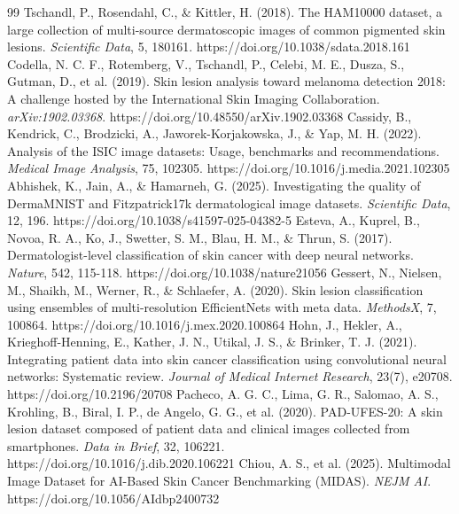 \documentclass[11pt,a4paper]{article}
\begin{document}
\begin{thebibliography}{99}
 Tschandl, P., Rosendahl, C., \& Kittler, H. (2018). The HAM10000 dataset, a large collection of multi-source dermatoscopic images of common pigmented skin lesions. \textit{Scientific Data}, 5, 180161. https://doi.org/10.1038/sdata.2018.161
 Codella, N. C. F., Rotemberg, V., Tschandl, P., Celebi, M. E., Dusza, S., Gutman, D., et al. (2019). Skin lesion analysis toward melanoma detection 2018: A challenge hosted by the International Skin Imaging Collaboration. \textit{arXiv:1902.03368}. https://doi.org/10.48550/arXiv.1902.03368
 Cassidy, B., Kendrick, C., Brodzicki, A., Jaworek-Korjakowska, J., \& Yap, M. H. (2022). Analysis of the ISIC image datasets: Usage, benchmarks and recommendations. \textit{Medical Image Analysis}, 75, 102305. https://doi.org/10.1016/j.media.2021.102305
 Abhishek, K., Jain, A., \& Hamarneh, G. (2025). Investigating the quality of DermaMNIST and Fitzpatrick17k dermatological image datasets. \textit{Scientific Data}, 12, 196. https://doi.org/10.1038/s41597-025-04382-5
 Esteva, A., Kuprel, B., Novoa, R. A., Ko, J., Swetter, S. M., Blau, H. M., \& Thrun, S. (2017). Dermatologist-level classification of skin cancer with deep neural networks. \textit{Nature}, 542, 115-118. https://doi.org/10.1038/nature21056
 Gessert, N., Nielsen, M., Shaikh, M., Werner, R., \& Schlaefer, A. (2020). Skin lesion classification using ensembles of multi-resolution EfficientNets with meta data. \textit{MethodsX}, 7, 100864. https://doi.org/10.1016/j.mex.2020.100864
 Hohn, J., Hekler, A., Krieghoff-Henning, E., Kather, J. N., Utikal, J. S., \& Brinker, T. J. (2021). Integrating patient data into skin cancer classification using convolutional neural networks: Systematic review. \textit{Journal of Medical Internet Research}, 23(7), e20708. https://doi.org/10.2196/20708
 Pacheco, A. G. C., Lima, G. R., Salomao, A. S., Krohling, B., Biral, I. P., de Angelo, G. G., et al. (2020). PAD-UFES-20: A skin lesion dataset composed of patient data and clinical images collected from smartphones. \textit{Data in Brief}, 32, 106221. https://doi.org/10.1016/j.dib.2020.106221
 Chiou, A. S., et al. (2025). Multimodal Image Dataset for AI-Based Skin Cancer Benchmarking (MIDAS). \textit{NEJM AI}. https://doi.org/10.1056/AIdbp2400732

\end{thebibliography}
\end{document}
